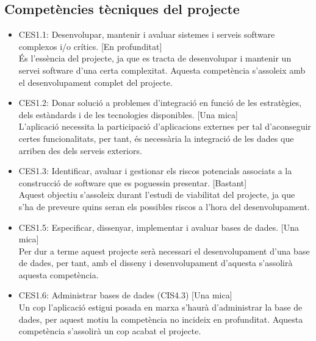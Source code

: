 \subsection{Competències tècniques del projecte}
\begin{itemize}
\item{}CES1.1: Desenvolupar, mantenir i avaluar sistemes i serveis software complexos i/o crítics. [En profunditat]\\
És l'essència del projecte, ja que es tracta de desenvolupar i mantenir un servei software d'una certa complexitat. Aquesta competència s'assoleix amb el desenvolupament complet del projecte.
\item{}CES1.2: Donar solució a problemes d'integració en funció de les estratègies, dels estàndards i de les tecnologies disponibles. [Una mica]\\
L'aplicació necessita la participació d'aplicacions externes per tal d'aconseguir certes funcionalitats, per tant, és necessària la integració de les dades que arriben des dels serveis exteriors.
\item{}CES1.3: Identificar, avaluar i gestionar els riscos potencials associats a la construcció de software que es poguessin presentar. [Bastant]\\
Aquest objectiu s'assoleix durant l'estudi de viabilitat del projecte, ja que s'ha de preveure quins seran els possibles riscos a l'hora del desenvolupament.
\item{}CES1.5: Especificar, dissenyar, implementar i avaluar bases de dades. [Una mica]\\
Per dur a terme aquest projecte serà necessari el desenvolupament d'una base de dades, per tant, amb el disseny i desenvolupament d'aquesta s'assolirà aquesta competència.
\item{}CES1.6: Administrar bases de dades (CIS4.3) [Una mica]\\
Un cop l'aplicació estigui posada en marxa s'haurà d'administrar la base de
dades, per aquest motiu la competència no incideix en profunditat. Aquesta
competència s'assolirà un cop acabat el projecte.


\end{itemize}
